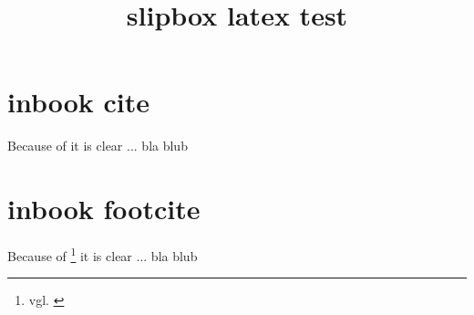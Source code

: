 \documentclass{scrartcl}
\title{slipbox latex test}
\author{}
\date{}
\begin{document}
\maketitle

\section{inbook cite}

Because of \cite{whiteheadq1} it is clear ... bla blub

\section{inbook footcite}

Because of \footnote{vgl. \cite{whiteheadq1}} it is clear ... bla blub



\end{document}
